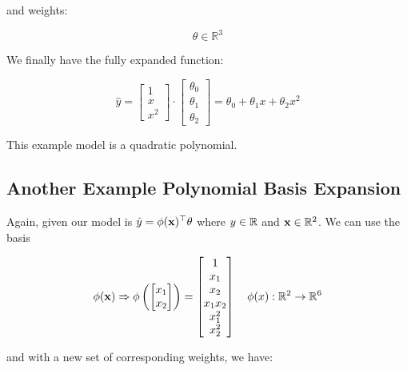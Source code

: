 and weights:

\begin{equation}
    \theta \in \mathbb{R}^3
\end{equation}

We finally have the fully expanded function:

\begin{equation}
    \hat{y} = \begin{bmatrix} 1 \\ x \\ x^2 \end{bmatrix} \cdot \begin{bmatrix} \theta_0 \\ \theta_1 \\ \theta_2 \end{bmatrix} = \theta_0 + \theta_1 x + \theta_2 x^2
\end{equation}

This example model is a quadratic polynomial.

\subsection{Another Example Polynomial Basis Expansion}
Again, given our model is $\hat{y} = \phi(\mathbf{x})^\top \theta$ where $y \in \mathbb{R} $ and $\mathbf{x} \in \mathbb{R}^2$. We can use the basis

\begin{equation}
    \phi(\mathbf{x}) \Rightarrow \phi\left(\begin{bmatrix} x_1 \\ x_2 \end{bmatrix}\right) = \begin{bmatrix} 1 \\ x_1 \\ x_2 \\ x_1x_2 \\ x_1^2 \\ x_2^2 \end{bmatrix} \quad \phi(x) : \mathbb{R}^2 \rightarrow \mathbb{R}^6
\end{equation}

and with a new set of corresponding weights, we have:

